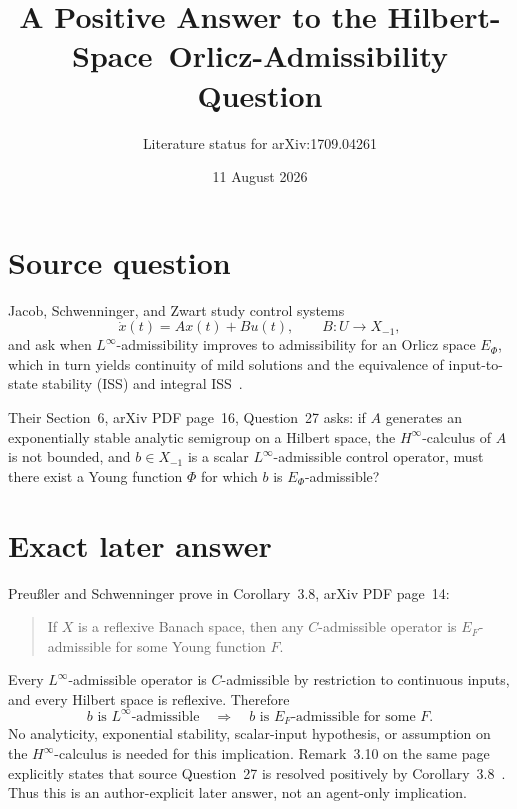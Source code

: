 \documentclass[11pt]{article}
\title{A Positive Answer to the Hilbert-Space\
Orlicz-Admissibility Question}
\author{Literature status for arXiv:1709.04261}
\date{11 August 2026}
\begin{document}
\maketitle

\begin{center}
\end{center}

\section*{Source question}

Jacob, Schwenninger, and Zwart study control systems
\[
 \dot x(t)=Ax(t)+Bu(t),\qquad B:U\longrightarrow X_{-1},
\]
and ask when $L^\infty$-admissibility improves to admissibility for an Orlicz
space $E_\Phi$, which in turn yields continuity of mild solutions and the
equivalence of input-to-state stability (ISS) and integral ISS~\cite{source}.

Their Section~6, arXiv PDF page~16, Question~27 asks: if $A$ generates an
exponentially stable analytic semigroup on a Hilbert space, the
$H^\infty$-calculus of $A$ is not bounded, and $b\in X_{-1}$ is a scalar
$L^\infty$-admissible control operator, must there exist a Young function
$\Phi$ for which $b$ is $E_\Phi$-admissible?

\section*{Exact later answer}

Preu\ss ler and Schwenninger prove in Corollary~3.8, arXiv PDF page~14:
\begin{quote}
If $X$ is a reflexive Banach space, then any $C$-admissible operator is
$E_F$-admissible for some Young function $F$.
\end{quote}
Every $L^\infty$-admissible operator is $C$-admissible by restriction to
continuous inputs, and every Hilbert space is reflexive. Therefore
\[
 b\text{ is }L^\infty\text{-admissible}
 \quad\Longrightarrow\quad
 b\text{ is }E_F\text{-admissible for some }F.
\]
No analyticity, exponential stability, scalar-input hypothesis, or assumption
on the $H^\infty$-calculus is needed for this implication. Remark~3.10 on the
same page explicitly states that source Question~27 is resolved positively by
Corollary~3.8~\cite{answer}. Thus this is an author-explicit later answer, not
an agent-only implication.
\end{document}
